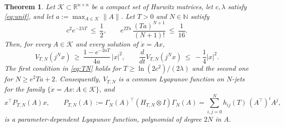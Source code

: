 \documentclass[preprint,12pt,authoryear]{elsarticle}
\newtheorem{theorem}{Theorem}
\theoremstyle{definition}
\theoremstyle{remark}
\newcommand{\R}{\mathbb{R}}
\newcommand{\N}{\mathbb{N}}
\newcommand{\tr}{^{\top}}
\newcommand{\KK}{\mathcal{K}}
\begin{document}
\begin{theorem}\label{thm:LTI}
Let $\KK\subset\R^{n\times n}$ be a compact set of Hurwitz matrices, let $c,\lambda$ satisfy \eqref{eq:unif}, and let $a:=\max_{A\in\KK}\|A\|$. Let $T>0$ and $N\in\N$ satisfy
\begin{equation}\label{eq:TN}
c^2e^{-2\lambda T}\ \le\ \frac12,\qquad e^{2Ta}\,\frac{(Ta)^{N+1}}{(N+1)!}\ \le\ \frac{1}{16}.
\end{equation}
Then, for every $A\in\KK$ and every solution of $\dot x=Ax$,
\begin{equation}\label{eq:concl}
V_{T,N}(j^Nx)\ \ge\ \frac{1-e^{-2aT}}{4a}\,|x|^2,\qquad \frac{d}{dt}V_{T,N}(j^Nx)\ \le\ -\frac14|x|^2 .
\end{equation}
The first condition in \eqref{eq:TN} holds for $T\ge\ln(2c^2)/(2\lambda)$ and the second one for $N\ge e^2Ta+2$.
Consequently, $V_{T,N}$ is a common Lyapunov function on $N$-jets for the family $\{\dot x=Ax:A\in\KK\}$, and
\begin{equation}\label{eq:PTN}
x\tr P_{T,N}(A)x,\qquad P_{T,N}(A):=\Gamma_N(A)\tr(H_{T,N}\otimes I)\Gamma_N(A)=\sum_{i,j=0}^Nh_{ij}(T)\,(A\tr)^iA^j,
\end{equation}
is a parameter-dependent Lyapunov function, polynomial of degree $2N$ in $A$.
\end{theorem}
\end{document}
